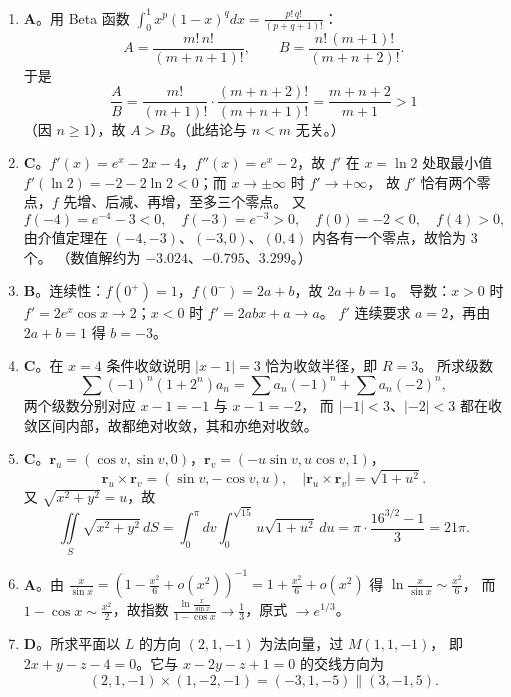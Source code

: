 \begin{enumerate}
{\begin{enumerate}
	\item
	\textbf{A}。用 Beta 函数 $\int_0^1x^{p}(1-x)^{q}dx=\frac{p!\,q!}{(p+q+1)!}$：
	\[
	A=\frac{m!\,n!}{(m+n+1)!},\qquad B=\frac{n!\,(m+1)!}{(m+n+2)!} .
	\]
	于是
	\[
	\frac{A}{B}=\frac{m!}{(m+1)!}\cdot\frac{(m+n+2)!}{(m+n+1)!}=\frac{m+n+2}{m+1}>1
	\]
	（因 $n\geqslant1$），故 $A>B$。（此结论与 $n<m$ 无关。）

	\item
	\textbf{C}。$f'(x)=e^{x}-2x-4$，$f''(x)=e^{x}-2$，故 $f'$ 在 $x=\ln2$ 处取最小值
	$f'(\ln2)=-2-2\ln2<0$；而 $x\to\pm\infty$ 时 $f'\to+\infty$，
	故 $f'$ 恰有两个零点，$f$ 先增、后减、再增，至多三个零点。
	又
	\[
	f(-4)=e^{-4}-3<0,\quad f(-3)=e^{-3}>0,\quad f(0)=-2<0,\quad f(4)>0,
	\]
	由介值定理在 $(-4,-3)$、$(-3,0)$、$(0,4)$ 内各有一个零点，故恰为 $3$ 个。
	（数值解约为 $-3.024$、$-0.795$、$3.299$。）

	\item
	\textbf{B}。连续性：$f\left(0^{+}\right)=1$，$f\left(0^{-}\right)=2a+b$，故 $2a+b=1$。
	导数：$x>0$ 时 $f'=2e^{x}\cos x\to2$；$x<0$ 时 $f'=2abx+a\to a$。
	$f'$ 连续要求 $a=2$，再由 $2a+b=1$ 得 $b=-3$。

	\item
	\textbf{C}。在 $x=4$ 条件收敛说明 $|x-1|=3$ 恰为收敛半径，即 $R=3$。
	所求级数
	\[
	\sum(-1)^n\left(1+2^n\right)a_n=\sum a_n(-1)^n+\sum a_n(-2)^n ,
	\]
	两个级数分别对应 $x-1=-1$ 与 $x-1=-2$，
	而 $|-1|<3$、$|-2|<3$ 都在收敛区间内部，故都绝对收敛，其和亦绝对收敛。

	\item
	\textbf{C}。$\bm{r}_u=(\cos v,\sin v,0)$，$\bm{r}_v=(-u\sin v,u\cos v,1)$，
	\[
	\bm{r}_u\times\bm{r}_v=(\sin v,-\cos v,u),\quad
	\left|\bm{r}_u\times\bm{r}_v\right|=\sqrt{1+u^2}.
	\]
	又 $\sqrt{x^2+y^2}=u$，故
	\[
	\iint\limits_{S}\sqrt{x^2+y^2}\,dS=\int_0^{\pi}\!\!dv\int_0^{\sqrt{15}}u\sqrt{1+u^2}\,du
	=\pi\cdot\frac{16^{3/2}-1}{3}=21\pi .
	\]

	\item
	\textbf{A}。由 $\frac{x}{\sin x}=\left(1-\frac{x^2}{6}+o\left(x^2\right)\right)^{-1}
	=1+\frac{x^2}{6}+o\left(x^2\right)$ 得 $\ln\frac{x}{\sin x}\sim\frac{x^2}{6}$，
	而 $1-\cos x\sim\frac{x^2}{2}$，故指数
	$\frac{\ln\frac{x}{\sin x}}{1-\cos x}\to\frac13$，原式 $\to e^{1/3}$。

	\item
	\textbf{D}。所求平面以 $L$ 的方向 $(2,1,-1)$ 为法向量，过 $M(1,1,-1)$，
	即 $2x+y-z-4=0$。它与 $x-2y-z+1=0$ 的交线方向为
	\[
	(2,1,-1)\times(1,-2,-1)=(-3,1,-5)\parallel(3,-1,5) .
	\]
\end{enumerate}
}



\end{enumerate}
